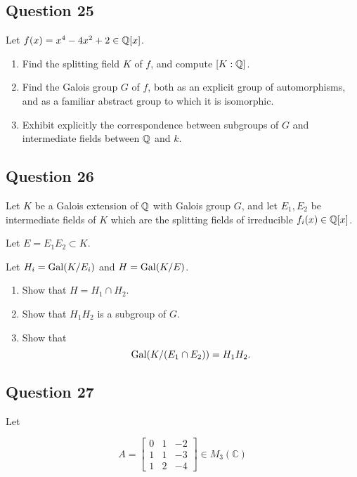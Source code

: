\documentclass[12pt]{article}
\begin{document}
\hypertarget{question-25}{%
\subsection{Question 25}\label{question-25}}

Let \(f(x) = x^4 - 4x^2 + 2 \in {\mathbb{Q}}[x]\).

\begin{enumerate}
\def\labelenumi{(\alph{enumi})}
\item
  Find the splitting field \(K\) of \(f\), and compute \([K: {\mathbb{Q}}]\).
\item
  Find the Galois group \(G\) of \(f\), both as an explicit group of
  automorphisms, and as a familiar abstract group to which it is
  isomorphic.
\item
  Exhibit explicitly the correspondence between subgroups of \(G\) and
  intermediate fields between \({\mathbb{Q}}\) and \(k\).
\end{enumerate}

\hypertarget{question-26}{%
\subsection{Question 26}\label{question-26}}

Let \(K\) be a Galois extension of \({\mathbb{Q}}\) with Galois group \(G\), and
let \(E_1 , E_2\) be intermediate fields of \(K\) which are the
splitting fields of irreducible \(f_i (x) \in {\mathbb{Q}}[x]\).

Let \(E = E_1 E_2 \subset K\).

Let \(H_i = \mathrm{Gal}(K/E_i)\) and \(H = \mathrm{Gal}(K/E)\).

\begin{enumerate}
\def\labelenumi{(\alph{enumi})}
\item
  Show that \(H = H_1 \cap H_2\).
\item
  Show that \(H_1 H_2\) is a subgroup of \(G\).
\item
  Show that \[
  \mathrm{Gal}(K/(E_1 \cap E_2 )) = H_1 H_2
  .\]
\end{enumerate}

\hypertarget{question-27}{%
\subsection{Question 27}\label{question-27}}

Let

\[
A=\left[\begin{array}{lll}{0} & {1} & {-2} \\ {1} & {1} & {-3} \\ {1} & {2} & {-4}\end{array}\right] \in M_{3}(\mathbb{C})
\]
\end{document}
